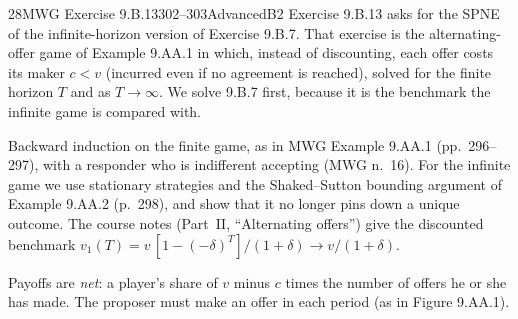 \begin{exsol}{28}{MWG Exercise 9.B.13}{302--303}{Advanced}{B2}
\asked Exercise 9.B.13 asks for the SPNE of the infinite-horizon version of Exercise 9.B.7.
That exercise is the alternating-offer game of Example 9.AA.1 in which, instead of discounting,
each offer costs its maker $c < v$ (incurred even if no agreement is reached), solved for the
finite horizon $T$ and as $T \to \infty$. We solve 9.B.7 first, because it is the benchmark
the infinite game is compared with.

\method Backward induction on the finite game, as in MWG Example 9.AA.1 (pp.~296--297), with a
responder who is indifferent accepting (MWG n.~16). For the infinite game we use stationary
strategies and the Shaked--Sutton bounding argument of Example 9.AA.2 (p.~298), and show that it
no longer pins down a unique outcome. The course notes (Part~II, ``Alternating offers'') give
the discounted benchmark $v_1(T) = v\,[1 - (-\delta)^T]/(1+\delta) \to v/(1+\delta)$.

\solution
Payoffs are \emph{net}: a player's share of $v$ minus $c$ times the number of offers he or she
has made. The proposer must make an offer in each period (as in Figure 9.AA.1).


\end{exsol}
